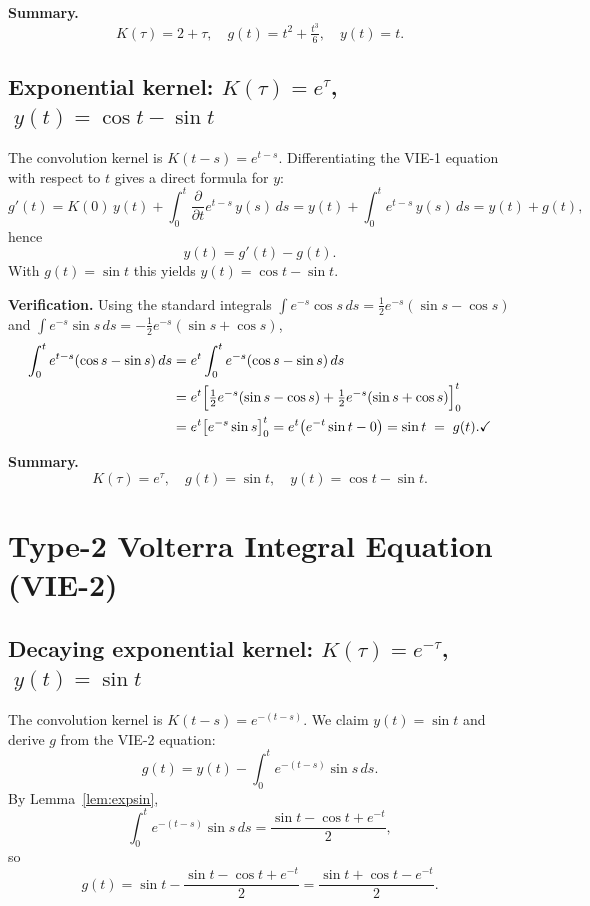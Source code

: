 \documentclass[11pt]{article}
\begin{document}
\medskip\noindent\textbf{Summary.}
\[
  \boxed{K(\tau)=2+\tau,\quad g(t)=t^2+\tfrac{t^3}{6},\quad y(t)=t.}
\]

\subsection{Exponential kernel: $K(\tau)=e^{\tau}$, $\;y(t)=\cos t - \sin t$}

The convolution kernel is $K(t-s)=e^{t-s}$.  Differentiating the
VIE-1 equation with respect to $t$ gives a direct formula for $y$:
\[
  g'(t)
  = K(0)\,y(t) + \int_0^t \frac{\partial}{\partial t}e^{t-s}\,y(s)\,ds
  = y(t) + \int_0^t e^{t-s}\,y(s)\,ds
  = y(t) + g(t),
\]
hence
\[
  y(t) = g'(t) - g(t).
\]
With $g(t)=\sin t$ this yields $y(t) = \cos t - \sin t$.

\medskip\noindent\textbf{Verification.}
Using the standard integrals
$\int e^{-s}\cos s\,ds = \tfrac{1}{2}e^{-s}(\sin s-\cos s)$ and
$\int e^{-s}\sin s\,ds = -\tfrac{1}{2}e^{-s}(\sin s+\cos s)$,
\begin{align*}
  \int_0^t e^{t-s}(\cos s-\sin s)\,ds
  &= e^t\int_0^t e^{-s}(\cos s-\sin s)\,ds \\
  &= e^t\Bigl[\tfrac{1}{2}e^{-s}(\sin s-\cos s)
              +\tfrac{1}{2}e^{-s}(\sin s+\cos s)\Bigr]_0^t \\
  &= e^t\bigl[e^{-s}\sin s\bigr]_0^t
   = e^t\bigl(e^{-t}\sin t - 0\bigr) = \sin t \;=\; g(t). \checkmark
\end{align*}

\medskip\noindent\textbf{Summary.}
\[
  \boxed{K(\tau)=e^{\tau},\quad g(t)=\sin t,\quad y(t)=\cos t-\sin t.}
\]

\section{Type-2 Volterra Integral Equation (VIE-2)}

\subsection{Decaying exponential kernel: $K(\tau)=e^{-\tau}$, $\;y(t)=\sin t$}

The convolution kernel is $K(t-s)=e^{-(t-s)}$.  We claim $y(t)=\sin t$
and derive $g$ from the VIE-2 equation:
\[
  g(t) = y(t) - \int_0^t e^{-(t-s)}\sin s\,ds.
\]
By Lemma~\ref{lem:expsin},
\[
  \int_0^t e^{-(t-s)}\sin s\,ds = \frac{\sin t - \cos t + e^{-t}}{2},
\]
so
\[
  g(t) = \sin t - \frac{\sin t - \cos t + e^{-t}}{2}
       = \frac{\sin t + \cos t - e^{-t}}{2}.
\]
\end{document}

